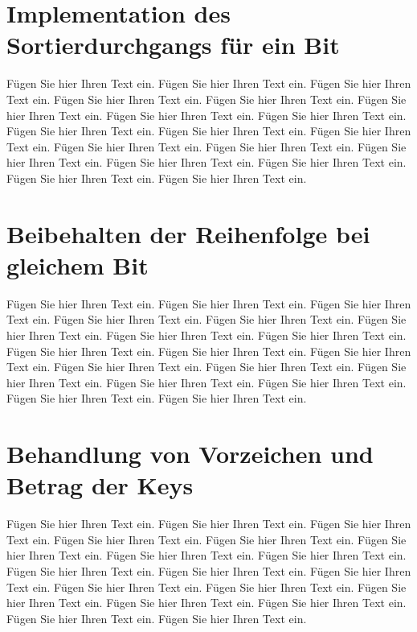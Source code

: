 \documentclass[12pt]{article}
\begin{document}
\section{Implementation des Sortierdurchgangs für ein Bit}

Fügen Sie hier Ihren Text ein. Fügen Sie hier Ihren Text ein. Fügen
Sie hier Ihren Text ein. Fügen Sie hier Ihren Text ein. Fügen Sie hier
Ihren Text ein. Fügen Sie hier Ihren Text ein. Fügen Sie hier Ihren
Text ein. Fügen Sie hier Ihren Text ein. Fügen Sie hier Ihren Text
ein. Fügen Sie hier Ihren Text ein. Fügen Sie hier Ihren Text
ein. Fügen Sie hier Ihren Text ein. Fügen Sie hier Ihren Text
ein. Fügen Sie hier Ihren Text ein. Fügen Sie hier Ihren Text
ein. Fügen Sie hier Ihren Text ein. Fügen Sie hier Ihren Text
ein. Fügen Sie hier Ihren Text ein.

\section{Beibehalten der Reihenfolge bei gleichem Bit}

Fügen Sie hier Ihren Text ein. Fügen Sie hier Ihren Text ein. Fügen
Sie hier Ihren Text ein. Fügen Sie hier Ihren Text ein. Fügen Sie hier
Ihren Text ein. Fügen Sie hier Ihren Text ein. Fügen Sie hier Ihren
Text ein. Fügen Sie hier Ihren Text ein. Fügen Sie hier Ihren Text
ein. Fügen Sie hier Ihren Text ein. Fügen Sie hier Ihren Text
ein. Fügen Sie hier Ihren Text ein. Fügen Sie hier Ihren Text
ein. Fügen Sie hier Ihren Text ein. Fügen Sie hier Ihren Text
ein. Fügen Sie hier Ihren Text ein. Fügen Sie hier Ihren Text
ein. Fügen Sie hier Ihren Text ein.

\section{Behandlung von Vorzeichen und Betrag der Keys}

Fügen Sie hier Ihren Text ein. Fügen Sie hier Ihren Text ein. Fügen
Sie hier Ihren Text ein. Fügen Sie hier Ihren Text ein. Fügen Sie hier
Ihren Text ein. Fügen Sie hier Ihren Text ein. Fügen Sie hier Ihren
Text ein. Fügen Sie hier Ihren Text ein. Fügen Sie hier Ihren Text
ein. Fügen Sie hier Ihren Text ein. Fügen Sie hier Ihren Text
ein. Fügen Sie hier Ihren Text ein. Fügen Sie hier Ihren Text
ein. Fügen Sie hier Ihren Text ein. Fügen Sie hier Ihren Text
ein. Fügen Sie hier Ihren Text ein. Fügen Sie hier Ihren Text
ein. Fügen Sie hier Ihren Text ein.
\end{document}
